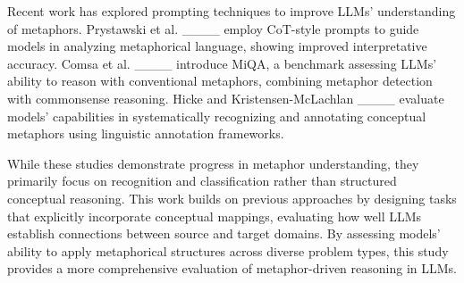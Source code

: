 Recent work has explored prompting techniques to improve LLMs’ understanding of metaphors. Prystawski et al. ____ employ CoT-style prompts to guide models in analyzing metaphorical language, showing improved interpretative accuracy. Comsa et al. ____ introduce MiQA, a benchmark assessing LLMs’ ability to reason with conventional metaphors, combining metaphor detection with commonsense reasoning. Hicke and Kristensen-McLachlan ____ evaluate models’ capabilities in systematically recognizing and annotating conceptual metaphors using linguistic annotation frameworks.

While these studies demonstrate progress in metaphor understanding, they primarily focus on recognition and classification rather than structured conceptual reasoning. This work builds on previous approaches by designing tasks that explicitly incorporate conceptual mappings, evaluating how well LLMs establish connections between source and target domains. By assessing models’ ability to apply metaphorical structures across diverse problem types, this study provides a more comprehensive evaluation of metaphor-driven reasoning in LLMs.